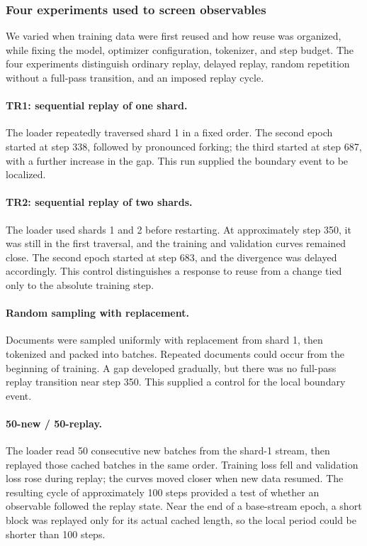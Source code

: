 \subsubsection{Four experiments used to screen observables}

We varied when training data were first reused and how reuse was organized, while fixing the model, optimizer configuration, tokenizer, and step budget. The four experiments distinguish ordinary replay, delayed replay, random repetition without a full-pass transition, and an imposed replay cycle.

\paragraph{TR1: sequential replay of one shard.}
The loader repeatedly traversed shard 1 in a fixed order. The second epoch started at step 338, followed by pronounced forking; the third started at step 687, with a further increase in the gap. This run supplied the boundary event to be localized.

\paragraph{TR2: sequential replay of two shards.}
The loader used shards 1 and 2 before restarting. At approximately step 350, it was still in the first traversal, and the training and validation curves remained close. The second epoch started at step 683, and the divergence was delayed accordingly. This control distinguishes a response to reuse from a change tied only to the absolute training step.

\paragraph{Random sampling with replacement.}
Documents were sampled uniformly with replacement from shard 1, then tokenized and packed into batches. Repeated documents could occur from the beginning of training. A gap developed gradually, but there was no full-pass replay transition near step 350. This supplied a control for the local boundary event.

\paragraph{50-new / 50-replay.}
The loader read 50 consecutive new batches from the shard-1 stream, then replayed those cached batches in the same order. Training loss fell and validation loss rose during replay; the curves moved closer when new data resumed. The resulting cycle of approximately 100 steps provided a test of whether an observable followed the replay state. Near the end of a base-stream epoch, a short block was replayed only for its actual cached length, so the local period could be shorter than 100 steps.

